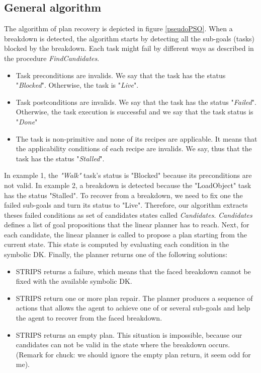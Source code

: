 \documentclass{llncs}
\begin{document}
		\subsection{General algorithm}
		\par The algorithm of plan recovery is depicted in figure \ref{pseudoPSO}. When a breakdown is detected, the algorithm starts by detecting all the sub-goals (tasks) blocked by the breakdown. 
		Each task might fail by different ways as described in the procedure \textit{FindCandidates}.
			\begin{itemize}
				\item Task preconditions are invalids. We say that the task has the status "\textit{Blocked}". Otherwise, the task is "\textit{Live}".
				\item Task postconditions are invalids. We say that the task has the status "\textit{Failed}". Otherwise, the task execution is successful and we say that the task status  is "\textit{Done}"
				\item The task is non-primitive and none of its recipes are applicable. It means that the applicability conditions of each recipe are invalids. We say, thus that the task has the status "\textit{Stalled}".
			\end{itemize}
		 In example 1, the \textit{"Walk"} task's status is "Blocked" because its preconditions are not valid.  In example 2, a breakdown is detected because the "LoadObject" task has the status "Stalled".  To recover from a breakdown, we need to fix one the failed sub-goals and turn its status to "Live". Therefore, our algorithm  extracts theses failed conditions as set of candidates states called \textit{Candidates}. \textit{Candidates} defines a list of goal propositions that the linear planner has to reach. Next, for each candidate, the linear planner is called to propose a plan starting from the current state. This state is computed by evaluating each  condition in the symbolic DK. Finally, the planner returns one of the following solutions: 
	 		\begin{itemize}
	 			\item STRIPS returns a failure, which means that the faced breakdown cannot be fixed with the available symbolic DK.
	 			\item STRIPS return one or more plan repair. The planner produces a sequence of actions that allows the agent to achieve one of or several sub-goals and help the agent to recover from the faced breakdown.\item STRIPS returns an empty plan. This situation is impossible, because our candidates can not be valid in the state where the breakdown occurs. (Remark for chuck: we should ignore the empty plan return, it seem odd for me).
	 		\end{itemize}
\end{document}
